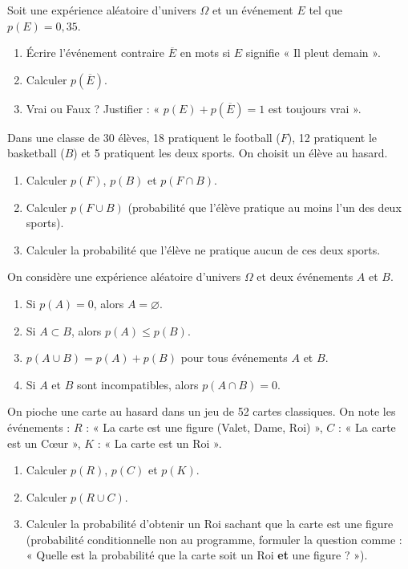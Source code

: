 \documentclass[11pt]{article}
\begin{document}
\begin{exercice}
Soit une expérience aléatoire d'univers $\Omega$ et un événement $E$ tel que $p(E) = 0,35$.
\begin{enumerate}
    \item Écrire l'événement contraire $\overline{E}$ en mots si $E$ signifie « Il pleut demain ».
    \item Calculer $p(\overline{E})$.
    \item Vrai ou Faux ? Justifier : « $p(E) + p(\overline{E}) = 1$ est toujours vrai ».
\end{enumerate}
\end{exercice}

\begin{exercice}
Dans une classe de 30 élèves, 18 pratiquent le football ($F$), 12 pratiquent le basketball ($B$) et 5 pratiquent les deux sports. On choisit un élève au hasard.
\begin{enumerate}
    \item Calculer $p(F)$, $p(B)$ et $p(F \cap B)$.
    \item Calculer $p(F \cup B)$ (probabilité que l'élève pratique au moins l'un des deux sports).
    \item Calculer la probabilité que l'élève ne pratique aucun de ces deux sports.
\end{enumerate}
\end{exercice}

\begin{exercice}
On considère une expérience aléatoire d'univers $\Omega$ et deux événements $A$ et $B$.
\begin{enumerate}
    \item Si $p(A) = 0$, alors $A = \varnothing$.
    \item Si $A \subset B$, alors $p(A) \le p(B)$.
    \item $p(A \cup B) = p(A) + p(B)$ pour tous événements $A$ et $B$.
    \item Si $A$ et $B$ sont incompatibles, alors $p(A \cap B) = 0$.
\end{enumerate}
\end{exercice}

\begin{exercice}
On pioche une carte au hasard dans un jeu de 52 cartes classiques. On note les événements :
$R$ : « La carte est une figure (Valet, Dame, Roi) »,
$C$ : « La carte est un Cœur »,
$K$ : « La carte est un Roi ».
\begin{enumerate}
    \item Calculer $p(R)$, $p(C)$ et $p(K)$.
    \item Calculer $p(R \cup C)$.
    \item Calculer la probabilité d'obtenir un Roi sachant que la carte est une figure (probabilité conditionnelle non au programme, formuler la question comme : « Quelle est la probabilité que la carte soit un Roi \textbf{et} une figure ? »).
\end{enumerate}
\end{exercice}
\end{document}
